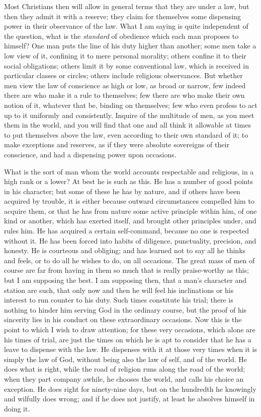 Most Christians then will allow in general terms that they are
under a law, but then they admit it with a reserve; they claim for
themselves some dispensing power in their observance of the law. What
I am saying is quite independent of the question, what is the \emph{standard}
of obedience which each man proposes to himself? One man puts the line
of his duty higher than another; some men take a low view of it,
confining it to mere personal morality; others confine it to their
social obligations; others limit it by some conventional law, which is
received in particular classes or circles; others include religious
observances. But whether men view the law of conscience as high or
low, as broad or narrow, few indeed there are who make it a rule to
themselves; few there are who make their own notion of it, whatever
that be, binding on themselves; few who even profess to act up to it
uniformly and consistently. Inquire of the multitude of men, as you
meet them in the world, and you will find that one and all think it
allowable at times to put themselves above the law, even according to
their own standard of it; to make exceptions and reserves, as if they
were absolute sovereigns of their conscience, and had a dispensing
power upon occasions.

What is the sort of man whom the world accounts respectable and
religious, in a high rank or a lower? At best he is such as this. He
has a number of good points in his character; but some of these he has
by nature, and if others have been acquired by trouble, it is either
because outward circumstances compelled him to acquire them, or that
he has from nature some active principle within him, of one kind or
another, which has exerted itself, and brought other principles under,
and rules him. He has acquired a certain self-command, because no one
is respected without it. He has been forced into habits of diligence,
punctuality, precision, and honesty. He is courteous and obliging; and
has learned not to say all he thinks and feels, or to do all he wishes
to do, on all occasions. The great mass of men of course are far from
having in them so much that is really praise-worthy as this; but I am
supposing the best. I am supposing then, that a man's character and
station are such, that only now and then he will feel his inclinations
or his interest to run counter to his duty. Such times constitute his
trial; there is nothing to hinder him serving God in the ordinary
course, but the proof of his sincerity lies in his conduct on these
extraordinary occasions. Now this is the point to which I wish to draw
attention; for these very occasions, which alone are his times of
trial, are just the times on which he is apt to consider that he has a
leave to dispense with the law. He dispenses with it at those very
times when it is simply the law of God, without being also the law of
self, and of the world. He does what is right, while the road of
religion runs along the road of the world; when they part company
awhile, he chooses the world, and calls his choice an exception. He
does right for ninety-nine days, but on the hundredth he knowingly and
wilfully does wrong; and if he does not justify, at least he absolves
himself in doing it.

